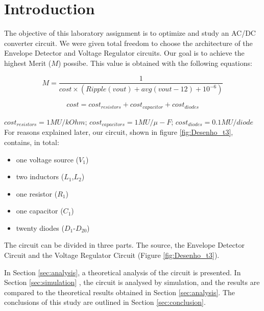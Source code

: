 
\section{Introduction}
\label{sec:introduction}



The objective of this laboratory assignment is to optimize and study an AC/DC converter
circuit. We were given total freedom to choose the architecture of the Envelope Detector
and Voltage Regulator circuits. Our goal is to achieve the highest Merit ($M$) possibe. This
value is obtained with the following equations:
	
\[
M = \frac{1}{cost\times (Ripple(vout) + avg(vout-12) + 10^{-6})}
\]

\[
 cost = cost_{resistors} + cost_{capacitor} + cost_{diodes} 
\]

$cost_{resistors} = 1MU/kOhm$; $cost_{capacitors} = 1MU/\mu- F$;
$cost_{diodes} = 0.1MU/diode$ \\

For reasons explained later, our circuit, shown in figure \ref{fig:Desenho_t3}, contains,
in total:

\begin{itemize}
	\item one voltage source ($V_1$)
	\item two inductors ($L_1$,$L_2$)
	\item one resistor ($R_1$)
	\item one capacitor ($C_1$)
	\item twenty diodes ($D_1$-$D_{20}$)
\end{itemize}

The circuit can be divided in three parts. The source, the Envelope Detector Circuit and the
Voltage Regulator Circuit (Figure \ref{fig:Desenho_t3}).

In Section \ref{sec:analysis}, a theoretical analysis of the circuit is presented. In
Section \ref{sec:simulation} , the circuit is analysed by simulation, and the results are
compared to the theoretical results obtained in Section \ref{sec:analysis}. The conclusions
of this study are outlined in Section \ref{sec:conclusion}.





